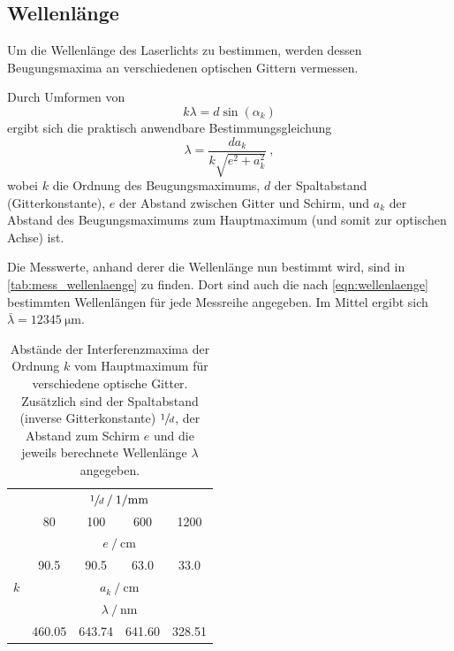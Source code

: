 \subsection{Wellenlänge}
\label{sec:auswertung:wellenlaenge}
Um die Wellenlänge des Laserlichts zu bestimmen,
werden dessen Beugungsmaxima an verschiedenen optischen Gittern vermessen.

Durch Umformen von
\begin{equation*}
  k \lambda = d \sin(\alpha_k)
\end{equation*}
ergibt sich die praktisch anwendbare Bestimmungsgleichung
\begin{equation}
  \lambda = \frac{d a_k}{k \sqrt{e^2 + a_k^2}} \ ,
  \label{eqn:wellenlaenge}
\end{equation}
wobei $k$ die Ordnung des Beugungsmaximums,
$d$ der Spaltabstand (Gitterkonstante),
$e$ der Abstand zwischen Gitter und Schirm, %
und $a_k$ der Abstand des Beugungsmaximums zum Hauptmaximum (und somit zur optischen Achse)
ist.

Die Messwerte, anhand derer die Wellenlänge nun bestimmt wird, sind in \autoref{tab:mess_wellenlaenge} zu finden.
Dort sind auch die nach \autoref{eqn:wellenlaenge} bestimmten Wellenlängen für jede Messreihe angegeben.
Im Mittel ergibt sich $\bar\lambda = \SI{12345}{\micro\meter}$.


\begin{table}
  \centering
  \caption{
    Abstände der Interferenzmaxima der Ordnung $k$ vom Hauptmaximum für verschiedene optische Gitter.
    Zusätzlich sind der Spaltabstand (inverse Gitterkonstante) $\sfrac{1}{d}$, der Abstand zum Schirm $e$ und die jeweils berechnete Wellenlänge $\lambda$ angegeben.
  }
  \label{tab:mess_wellenlaenge}
  \begin{tabular}{S S S S S}
  \toprule
  &  \\
  \cmidrule(lr){2-5}
  & 80 & 100 & 600 & 1200 \\
  \midrule

  &  \\
  \cmidrule(lr){2-5}
  & 90.5 & 90.5 & 63.0 & 33.0 \\
  \midrule

  {$k$} &
   \\
  \midrule

  \midrule

  &  \\
  \cmidrule(lr){2-5}
  & 460.05  & 643.74  & 641.60  & 328.51  \\
  \bottomrule
  \end{tabular}
\end{table}
